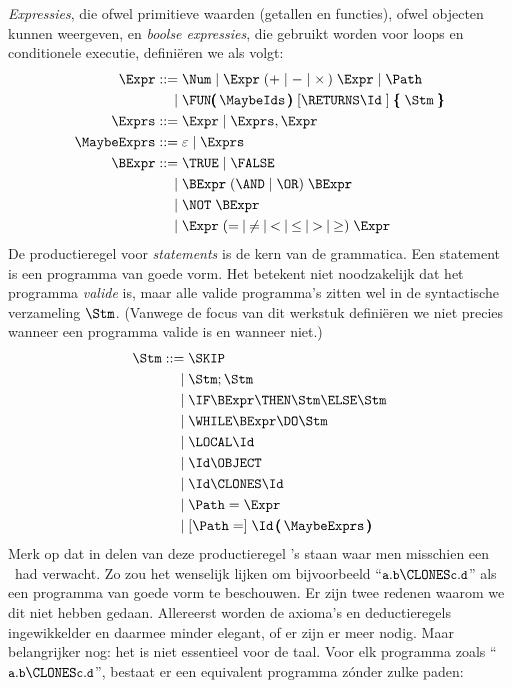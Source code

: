\emph{Expressies}, die ofwel primitieve waarden (getallen en functies), ofwel objecten kunnen weergeven, en \emph{boolse expressies}, die gebruikt worden voor loops en conditionele executie, definiëren we als volgt:
%
\begin{align*}
  \Expr \GrammarDef \Num \mid \Expr\; (+ \mid - \mid \times \,)\; \Expr \mid \Path \\
  \GrammarOr \FUN\pmb{(}\,\MaybeIds\,\pmb{)}\; \GrammarOpt{\RETURNS \Id\;} \pmb{\{}\; \Stm\; \pmb{\}} \\
  \Exprs \GrammarDef \Expr \mid \Exprs, \Expr \\
  \MaybeExprs \GrammarDef \varepsilon \mid \Exprs \\
  \BExpr \GrammarDef \TRUE \mid \FALSE \\
  \GrammarOr \BExpr\; (\AND \mid \OR)\; \BExpr \\
  \GrammarOr \NOT\; \BExpr \\
  \GrammarOr \Expr\; (=\: \mid\: \neq\: \mid\: <\: \mid\: \le\: \mid\: >\: \mid\: \ge)\; \Expr
\end{align*}
%
De productieregel voor \emph{statements} is de kern van de grammatica. Een statement is een programma van goede vorm. Het betekent niet noodzakelijk dat het programma \emph{valide} is, maar alle valide programma's zitten wel in de syntactische verzameling $\Stm$. (Vanwege de focus van dit werkstuk definiëren we niet precies wanneer een programma valide is en wanneer niet.)
%
\begin{align*}
  \Stm \GrammarDef \SKIP \\
  \GrammarOr \Stm; \Stm \\
  \GrammarOr \IF \BExpr \THEN \Stm \ELSE \Stm \\
  \GrammarOr \WHILE \BExpr \DO \Stm \\
  \GrammarOr \LOCAL \Id \\
  \GrammarOr \Id \OBJECT \\
  \GrammarOr \Id \CLONES \Id \\
  \GrammarOr \Path = \Expr \\
  \GrammarOr \GrammarOpt{\Path =} \Id\,\pmb{(}\,\MaybeExprs\,\pmb{)}
\end{align*}
%
Merk op dat in delen van deze productieregel \Id's staan waar men misschien een \Path\ had verwacht. Zo zou het wenselijk lijken om bijvoorbeeld “$\id{a}.\id{b} \CLONES \id{c}.\id{d}$” als een programma van goede vorm te beschouwen. Er zijn twee redenen waarom we dit niet hebben gedaan. Allereerst worden de axioma's en deductieregels ingewikkelder en daarmee minder elegant, of er zijn er meer nodig. Maar belangrijker nog: het is niet essentieel voor de taal. Voor elk programma zoals “$\id{a}.\id{b} \CLONES \id{c}.\id{d}$”, bestaat er een equivalent programma zónder zulke paden:

